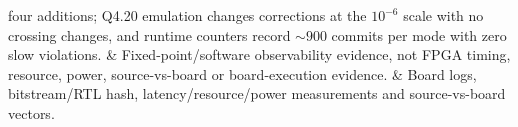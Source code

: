 \documentclass[11pt]{article}
\begin{document}
\begin{table}[ht]
\begin{tabular}
four additions; Q4.20 emulation changes corrections at the \(10^{-6}\) scale
with no crossing changes, and runtime counters record \(\sim900\) commits per
mode with zero slow violations. & Fixed-point/software observability evidence,
not FPGA timing, resource, power, source-vs-board or board-execution evidence.
& Board logs, bitstream/RTL hash, latency/resource/power measurements and
source-vs-board vectors. \\
\bottomrule
\end{tabular}
\caption{Compressed result-layer map for the synchronized experimental material.
The table brings more of the submission-draft result hierarchy into the note
while preserving the validation boundary for all-scenario, holdout and board
claims.}
\label{tab:upgrade-threshold-note}
\end{table}
\end{document}
